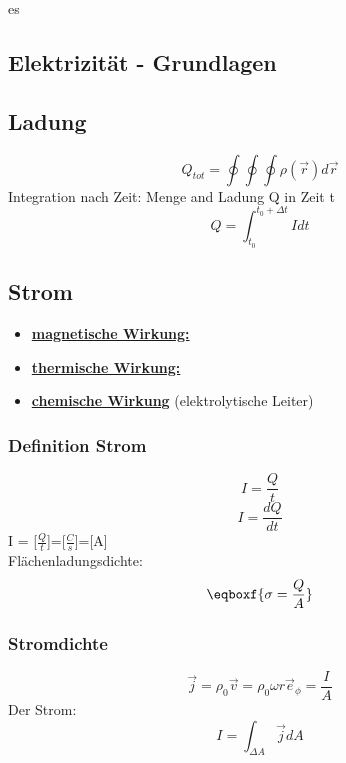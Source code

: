 es\documentclass[a4paper, fontsize=8pt, landscape]{scrartcl}
\newcommand{\hl}[1]{\underline{\textbf{#1}}}
\begin{document}
\begin{multicols*}{4}
\columnbreak

\section{Elektrizität - Grundlagen}
\subsection{Ladung}
    \[Q_{tot} = \oint\oint\oint\rho(\vec{r})d\vec{r}\] 
    Integration nach Zeit: Menge and Ladung Q in Zeit t
        \[Q = \int_{t_0}^{t_0+\Delta t} I dt\]
\subsection{Strom}
    \begin{itemize}
        \item \hl{magnetische Wirkung:} \\
        \item \hl{thermische Wirkung:} \\
        \item \hl{chemische Wirkung} (elektrolytische Leiter)\\
    \end{itemize}

\subsubsection{Definition Strom}
        \[I = \frac{Q}{t}\]
        \[ I = \frac{dQ}{dt}\]
    I = [$\frac{Q}{t}$]=[$\frac{C}{s}$]=[A]\\

    
    Flächenladungsdichte:
    \[\eqboxf{\sigma = \frac{Q}{A}}\]
    

\subsubsection{Stromdichte}
    \[\vec j = \rho_0 \vec v = \rho_0 \omega r \vec e_\phi = \frac{I}{A}\]
    Der Strom:
    \[I = \int_{\Delta A} \vec j dA\]


\end{multicols*}
\end{document}
